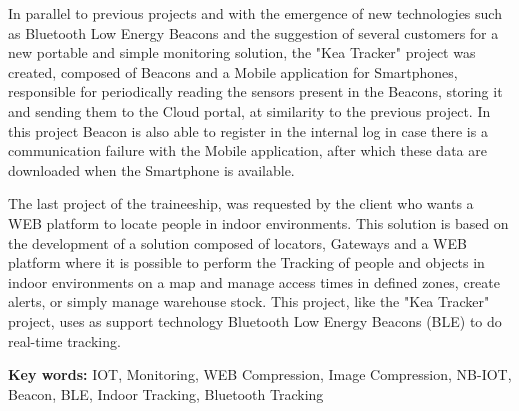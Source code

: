 \par In parallel to previous projects and with the emergence of new technologies such as Bluetooth Low Energy Beacons and the suggestion of several customers for a new portable and simple monitoring solution, the "Kea Tracker" project was created, composed of Beacons and a Mobile application for Smartphones, responsible for periodically reading the sensors present in the Beacons, storing it and sending them to the Cloud portal, at similarity to the previous project. In this project Beacon is also able to register in the internal log in case there is a communication failure with the Mobile application, after which these data are downloaded when the Smartphone is available.


\par The last project of the traineeship, was requested by the client who wants a WEB platform to locate people in indoor environments. This solution is based on the development of a solution composed of locators, Gateways and a WEB platform where it is possible to perform the Tracking of people and objects in indoor environments on a map and manage access times in defined zones, create alerts, or simply manage warehouse stock. This project, like the "Kea Tracker" project, uses as support technology Bluetooth Low Energy Beacons (BLE) to do real-time tracking.



\bigskip

\textbf{Key words:} 
IOT, Monitoring, WEB Compression, Image Compression, NB-IOT, Beacon, BLE, Indoor Tracking, Bluetooth Tracking